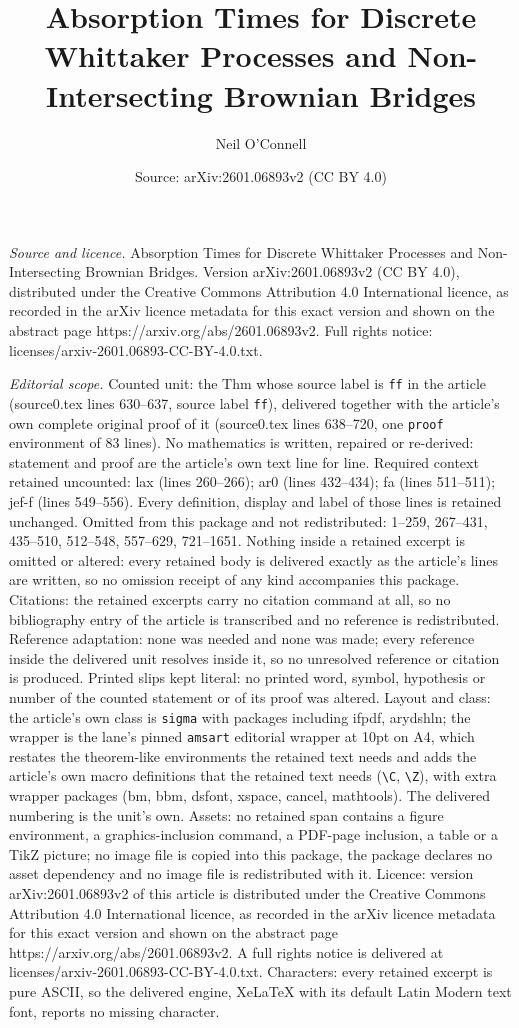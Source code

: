 \documentclass[10pt,a4paper]{amsart}
\title[Absorption Times for Discrete Whittaker Processes and Non-In]{Absorption Times for Discrete Whittaker Processes and Non-Intersecting Brownian Bridges}
\author{Neil O'Connell}
\date{Source: arXiv:2601.06893v2 (CC BY 4.0)}
\begin{document}
\maketitle

\noindent\emph{Source and licence.} Absorption Times for Discrete Whittaker Processes and Non-Intersecting Brownian Bridges. Version arXiv:2601.06893v2 (CC BY 4.0), distributed under the Creative Commons Attribution 4.0 International licence, as recorded in the arXiv licence metadata for this exact version and shown on the abstract page https://arxiv.org/abs/2601.06893v2. Full rights notice: licenses/arxiv-2601.06893-CC-BY-4.0.txt.\par\smallskip

\noindent\textit{Editorial scope.} Counted unit: the Thm whose source label is \texttt{ff} in the article (source0.tex lines 630--637, source label \texttt{ff}), delivered together with the article's own complete original proof of it (source0.tex lines 638--720, one \texttt{proof} environment of 83 lines). No mathematics is written, repaired or re-derived: statement and proof are the article's own text line for line. Required context retained uncounted: lax (lines 260--266); ar0 (lines 432--434); fa (lines 511--511); jef-f (lines 549--556). Every definition, display and label of those lines is retained unchanged. Omitted from this package and not redistributed: 1--259, 267--431, 435--510, 512--548, 557--629, 721--1651. Nothing inside a retained excerpt is omitted or altered: every retained body is delivered exactly as the article's lines are written, so no omission receipt of any kind accompanies this package. Citations: the retained excerpts carry no citation command at all, so no bibliography entry of the article is transcribed and no reference is redistributed. Reference adaptation: none was needed and none was made; every reference inside the delivered unit resolves inside it, so no unresolved reference or citation is produced. Printed slips kept literal: no printed word, symbol, hypothesis or number of the counted statement or of its proof was altered. Layout and class: the article's own class is \texttt{sigma} with packages including ifpdf, arydshln; the wrapper is the lane's pinned \texttt{amsart} editorial wrapper at 10pt on A4, which restates the theorem-like environments the retained text needs and adds the article's own macro definitions that the retained text needs (\texttt{\textbackslash C}, \texttt{\textbackslash Z}), with extra wrapper packages (bm, bbm, dsfont, xspace, cancel, mathtools). The delivered numbering is the unit's own. Assets: no retained span contains a figure environment, a graphics-inclusion command, a PDF-page inclusion, a table or a TikZ picture; no image file is copied into this package, the package declares no asset dependency and no image file is redistributed with it. Licence: version arXiv:2601.06893v2 of this article is distributed under the Creative Commons Attribution 4.0 International licence, as recorded in the arXiv licence metadata for this exact version and shown on the abstract page https://arxiv.org/abs/2601.06893v2. A full rights notice is delivered at licenses/arxiv-2601.06893-CC-BY-4.0.txt. Characters: every retained excerpt is pure ASCII, so the delivered engine, XeLaTeX with its default Latin Modern text font, reports no missing character.
\end{document}
